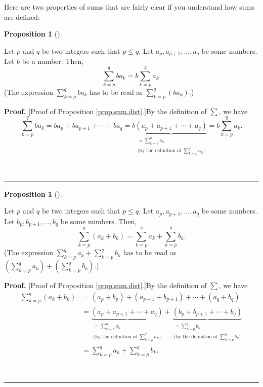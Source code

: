 \documentclass[numbers=enddot,12pt,final,onecolumn,notitlepage]{scrartcl}%
\theoremstyle{definition}
\newtheorem{prop}[theo]{Proposition}
\newenvironment{proposition}[1][]
{\begin{prop}[#1]\begin{leftbar}}
{\end{leftbar}\end{prop}}
\newenvironment{proof}[1][Proof]{\noindent\textbf{#1.} }{\ \rule{0.5em}{0.5em}}
\let\sumnonlimits\sum
\renewcommand{\sum}{\sumnonlimits\limits}
\begin{document}
Here are two properties of sums that are fairly clear if you understand how
sums are defined:

\begin{proposition}
\label{prop.sum.dist}Let $p$ and $q$ be two integers such that $p\leq q$. Let
$a_{p},a_{p+1},\ldots,a_{q}$ be some numbers. Let $b$ be a number. Then,
\[
\sum_{k=p}^{q}ba_{k}=b\sum_{k=p}^{q}a_{k}.
\]
(The expression $\sum_{k=p}^{q}ba_{k}$ has to be read as $\sum_{k=p}%
^{q}\left(  ba_{k}\right)  $.)
\end{proposition}

\begin{proof}
[Proof of Proposition \ref{prop.sum.dist}.]By the definition of $\sum$, we
have%
\[
\sum_{k=p}^{q}ba_{k}=ba_{p}+ba_{p+1}+\cdots+ba_{q}=b\underbrace{\left(
a_{p}+a_{p+1}+\cdots+a_{q}\right)  }_{\substack{=\sum_{k=p}^{q}a_{k}%
\\\text{(by the definition of }\sum_{k=p}^{q}a_{k}\text{)}}}=b\sum_{k=p}%
^{q}a_{k}.
\]

\end{proof}

\begin{proposition}
\label{prop.sum.a+b}Let $p$ and $q$ be two integers such that $p\leq q$. Let
$a_{p},a_{p+1},\ldots,a_{q}$ be some numbers. Let $b_{p},b_{p+1},\ldots,b_{q}$
be some numbers. Then,
\[
\sum_{k=p}^{q}\left(  a_{k}+b_{k}\right)  =\sum_{k=p}^{q}a_{k}+\sum_{k=p}%
^{q}b_{k}.
\]
(The expression $\sum_{k=p}^{q}a_{k}+\sum_{k=p}^{q}b_{k}$ has to be read as
$\left(  \sum_{k=p}^{q}a_{k}\right)  +\left(  \sum_{k=p}^{q}b_{k}\right)  $.)
\end{proposition}

\begin{proof}
[Proof of Proposition \ref{prop.sum.dist}.]By the definition of $\sum$, we
have%
\begin{align*}
\sum_{k=p}^{q}\left(  a_{k}+b_{k}\right)   &  =\left(  a_{p}+b_{p}\right)
+\left(  a_{p+1}+b_{p+1}\right)  +\cdots+\left(  a_{q}+b_{q}\right) \\
&  =\underbrace{\left(  a_{p}+a_{p+1}+\cdots+a_{q}\right)  }_{\substack{=\sum
_{k=p}^{q}a_{k}\\\text{(by the definition of }\sum_{k=p}^{q}a_{k}\text{)}%
}}+\underbrace{\left(  b_{p}+b_{p+1}+\cdots+b_{q}\right)  }_{\substack{=\sum
_{k=p}^{q}b_{k}\\\text{(by the definition of }\sum_{k=p}^{q}b_{k}\text{)}}}\\
&  =\sum_{k=p}^{q}a_{k}+\sum_{k=p}^{q}b_{k}.
\end{align*}

\end{proof}
\end{document}
